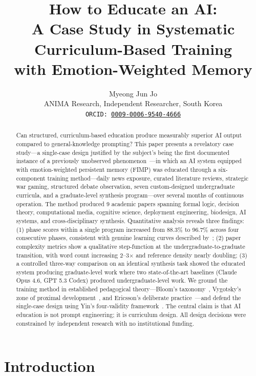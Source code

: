 \documentclass[11pt,a4paper]{article}
\title{\textbf{How to Educate an AI:\\A Case Study in Systematic Curriculum-Based Training\\with Emotion-Weighted Memory}}
\author{Myeong Jun Jo \\ ANIMA Research, Independent Researcher, South Korea \\ \texttt{ORCID: \href{https://orcid.org/0009-0006-9540-4666}{0009-0006-9540-4666}}}
\date{}
\begin{document}
\maketitle

\begin{abstract}
Can structured, curriculum-based education produce measurably superior AI output compared to general-knowledge prompting? This paper presents a revelatory case study---a single-case design justified by the subject's being the first documented instance of a previously unobserved phenomenon~\citep{yin2018case}---in which an AI system equipped with emotion-weighted persistent memory (FIMP) was educated through a six-component training method---daily news exposure, curated literature reviews, strategic war gaming, structured debate observation, seven custom-designed undergraduate curricula, and a graduate-level synthesis program---over several months of continuous operation. The method produced 9 academic papers spanning formal logic, decision theory, computational media, cognitive science, deployment engineering, biodesign, AI systems, and cross-disciplinary synthesis. Quantitative analysis reveals three findings: (1) phase scores within a single program increased from 88.3\% to 96.7\% across four consecutive phases, consistent with genuine learning curves described by~\citet{ericsson1993role}; (2) paper complexity metrics show a qualitative step-function at the undergraduate-to-graduate transition, with word count increasing 2--3$\times$ and reference density nearly doubling; (3) a controlled three-way comparison on an identical synthesis task showed the educated system producing graduate-level work where two state-of-the-art baselines (Claude Opus 4.6, GPT 5.3 Codex) produced undergraduate-level work. We ground the training method in established pedagogical theory---Bloom's taxonomy~\citep{bloom1956taxonomy}, Vygotsky's zone of proximal development~\citep{vygotsky1978mind}, and Ericsson's deliberate practice~\citep{ericsson1993role}---and defend the single-case design using Yin's four-validity framework~\citep{yin2018case}. The central claim is that AI education is not prompt engineering; it is curriculum design. All design decisions were constrained by independent research with no institutional funding.
\end{abstract}

\section{Introduction}\label{sec:intro}
\end{document}
